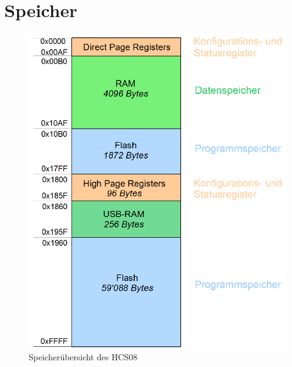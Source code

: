 \newpage
\section{Speicher}

\begin{figure}[h!]
	\centering
	\includegraphics[scale=0.75]{../fig/memory.pdf}
	\caption{Speicherübersicht des HCS08}
\end{figure}
